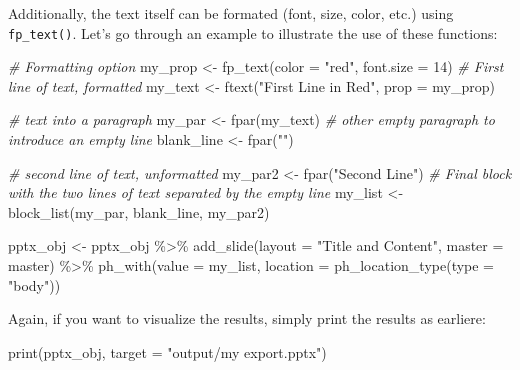 \documentclass[
]{krantz}
\makeatletter
\newenvironment{Shaded}{\begin{snugshade}}{\end{snugshade}}
\newcommand{\AttributeTok}[1]{\textcolor[rgb]{0.61,0.61,0.61}{#1}}
\newcommand{\CommentTok}[1]{\textcolor[rgb]{0.37,0.37,0.37}{\textit{#1}}}
\newcommand{\DecValTok}[1]{\textcolor[rgb]{0.06,0.06,0.06}{#1}}
\newcommand{\FunctionTok}[1]{\textcolor[rgb]{0,0,0}{#1}}
\newcommand{\NormalTok}[1]{#1}
\newcommand{\OtherTok}[1]{\textcolor[rgb]{0.37,0.37,0.37}{#1}}
\newcommand{\SpecialCharTok}[1]{\textcolor[rgb]{0,0,0}{#1}}
\newcommand{\StringTok}[1]{\textcolor[rgb]{0.5,0.5,0.5}{#1}}
\newenvironment{kframe}{%
\medskip{}
\setlength{\fboxsep}{.8em}
 \def\at@end@of@kframe{}%
 \ifinner\ifhmode%
  \def\at@end@of@kframe{\end{minipage}}%
  \begin{minipage}{\columnwidth}%
 \fi\fi%
 \def\FrameCommand##1{\hskip\@totalleftmargin \hskip-\fboxsep
 \colorbox{shadecolor}{##1}\hskip-\fboxsep
     \hskip-\linewidth \hskip-\@totalleftmargin \hskip\columnwidth}%
 \MakeFramed {\advance\hsize-\width
   \@totalleftmargin\z@ \linewidth\hsize
   \@setminipage}}%
 {\par\unskip\endMakeFramed%
 \at@end@of@kframe}
\renewenvironment{Shaded}{\begin{kframe}}{\end{kframe}}
\makeatother
\begin{document}
Additionally, the text itself can be formated (font, size, color, etc.) using \texttt{fp\_text()}. Let's go through an example to illustrate the use of these functions:

\begin{Shaded}
\begin{Highlighting}[]
\CommentTok{\# Formatting option}
\NormalTok{my\_prop }\OtherTok{\textless{}{-}} \FunctionTok{fp\_text}\NormalTok{(}\AttributeTok{color =} \StringTok{"red"}\NormalTok{, }\AttributeTok{font.size =} \DecValTok{14}\NormalTok{) }
\CommentTok{\# First line of text, formatted}
\NormalTok{my\_text }\OtherTok{\textless{}{-}} \FunctionTok{ftext}\NormalTok{(}\StringTok{"First Line in Red"}\NormalTok{, }\AttributeTok{prop =}\NormalTok{ my\_prop) }

\CommentTok{\# text into a paragraph}
\NormalTok{my\_par }\OtherTok{\textless{}{-}} \FunctionTok{fpar}\NormalTok{(my\_text) }
\CommentTok{\# other empty paragraph to introduce an empty line}
\NormalTok{blank\_line }\OtherTok{\textless{}{-}} \FunctionTok{fpar}\NormalTok{(}\StringTok{""}\NormalTok{) }

\CommentTok{\# second line of text, unformatted}
\NormalTok{my\_par2 }\OtherTok{\textless{}{-}} \FunctionTok{fpar}\NormalTok{(}\StringTok{"Second Line"}\NormalTok{) }
\CommentTok{\# Final block with the two lines of text separated by the empty line}
\NormalTok{my\_list }\OtherTok{\textless{}{-}} \FunctionTok{block\_list}\NormalTok{(my\_par, blank\_line, my\_par2) }

\NormalTok{pptx\_obj }\OtherTok{\textless{}{-}}\NormalTok{ pptx\_obj }\SpecialCharTok{\%\textgreater{}\%}
  \FunctionTok{add\_slide}\NormalTok{(}\AttributeTok{layout =} \StringTok{"Title and Content"}\NormalTok{, }\AttributeTok{master =}\NormalTok{ master) }\SpecialCharTok{\%\textgreater{}\%} 
  \FunctionTok{ph\_with}\NormalTok{(}\AttributeTok{value =}\NormalTok{ my\_list, }
          \AttributeTok{location =} \FunctionTok{ph\_location\_type}\NormalTok{(}\AttributeTok{type =} \StringTok{"body"}\NormalTok{))}
\end{Highlighting}
\end{Shaded}

Again, if you want to visualize the results, simply print the results as earliere:

\begin{Shaded}
\begin{Highlighting}[]
\FunctionTok{print}\NormalTok{(pptx\_obj, }\AttributeTok{target =} \StringTok{"output/my export.pptx"}\NormalTok{)}
\end{Highlighting}
\end{Shaded}
\end{document}

